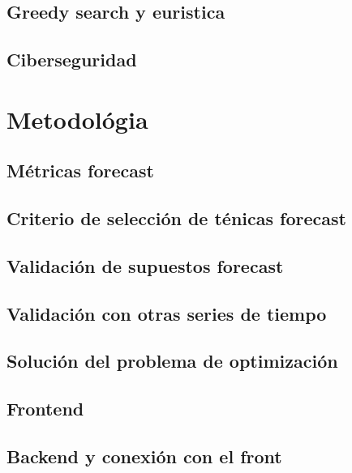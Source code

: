 \documentclass[12pt]{article}
\begin{document}
\subsection{Greedy search y euristica} \label{sec:greedy search}


\subsection{Ciberseguridad} \label{sec:greedy search}


\section{Metodológia} \label{sec: metodologia}


\subsection{Métricas forecast} \label{sec: metodologia}


\subsection{Criterio de selección de ténicas forecast} \label{sec: metodologia}


\subsection{Validación de supuestos forecast} \label{sec: metodologia}


\subsection{Validación con otras series de tiempo} \label{sec: metodologia}


\subsection{Solución del problema de optimización} \label{sec: metodologia}


\subsection{Frontend} \label{sec: metodologia}


\subsection{Backend y conexión con el front} \label{sec: metodologia}

\end{document}

